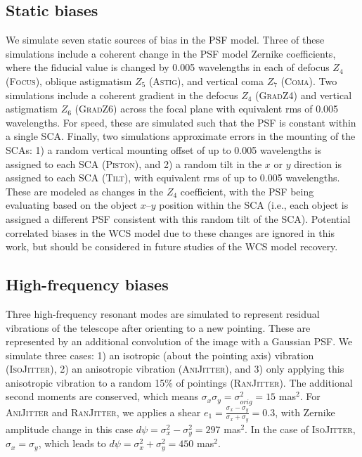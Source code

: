 \documentclass[aps,prd, amsmath,amssymb,superscriptaddress,showkeys,nofootinbib,reprint,preprintnumbers]{revtex4-1}
\begin{document}
\subsection{Static biases}\label{sec:static}

We simulate seven static sources of bias in the PSF model. 
Three of these simulations include a coherent change in the PSF model Zernike coefficients, where the fiducial value is changed by 0.005 wavelengths in each of defocus $Z_4$ (\textsc{Focus}), oblique astigmatism $Z_5$ (\textsc{Astig}), and vertical coma $Z_7$ (\textsc{Coma}). 
Two simulations include a coherent gradient in the defocus $Z_4$ (\textsc{GradZ4}) and vertical astigmatism $Z_6$ (\textsc{GradZ6}) across the focal plane with equivalent rms of 0.005 wavelengths. 
For speed, these are simulated such that the PSF is constant within a single SCA. Finally, two simulations approximate errors in the mounting of the SCAs: 1) a random vertical mounting offset of up to 0.005 wavelengths is assigned to each SCA (\textsc{Piston}), and 2) a random tilt in the $x$ or $y$ direction is assigned to each SCA  (\textsc{Tilt}), with equivalent rms of up to 0.005 wavelengths. 
These are modeled as changes in the $Z_4$ coefficient, with the PSF being evaluating based on the object $x$--$y$ position within the SCA (i.e., each object is assigned a different PSF consistent with this random tilt of the SCA). 
Potential correlated biases in the WCS model due to these changes are ignored in this work, but should be considered in future studies of the WCS model recovery.

\subsection{High-frequency biases}\label{sec:low}

Three high-frequency resonant modes are simulated to represent residual vibrations of the telescope after orienting to a new pointing. 
These are represented by an additional convolution of the image with a Gaussian PSF. We simulate three cases: 1) an isotropic (about the pointing axis) vibration  (\textsc{IsoJitter}), 2) an anisotropic vibration (\textsc{AniJitter}), and 3) only applying this anisotropic vibration to a random 15\% of pointings (\textsc{RanJitter}). The additional second moments are conserved, which means $\sigma_x\sigma_y=\sigma_{orig}^2=15$ mas$^2$. For \textsc{AniJitter} and \textsc{RanJitter}, we applies a shear $e_1=\frac{\sigma_x-\sigma_y}{\sigma_x+\sigma_y}=0.3$,  with Zernike amplitude change in this case  $d\psi=\sigma_x^2-\sigma_y^2=297$ mas$^2$. In the case of \textsc{IsoJitter}, $\sigma_x=\sigma_y$, which leads to $d\psi=\sigma_x^2+\sigma_y^2=450$ mas$^2$.
\end{document}

